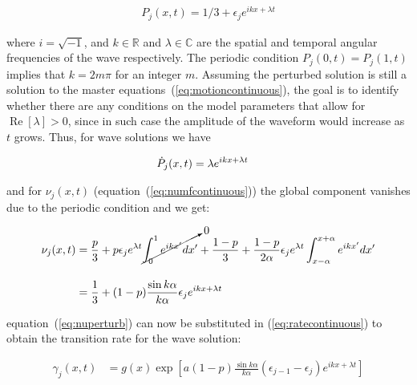 \begin{align}
    P_j(x,t) = 1/3 + \epsilon_j e^{ikx + \lambda t}
\end{align}

\noindent where $i=\sqrt{-1}$, and $k\in\mathbb{R}$ and $\lambda\in\mathbb{C}$ are the spatial and temporal angular frequencies of the
wave respectively. The periodic condition $P_j(0,t) = P_j(1,t)$ implies that $k=2m\pi$ for an integer $m$. Assuming the perturbed
solution is still a solution to the master equations~(\ref{eq:motioncontinuous}), the goal is to identify whether there are any
conditions on the model parameters that allow for $\operatorname{Re}[\lambda]>0$, since in such case the amplitude of the waveform
would increase as $t$ grows. Thus, for wave solutions we have

\begin{align}
    \dot{P}_j(x,t) &= \lambda e^{ikx + \lambda t}
    \label{eq:dpperturb}
\end{align}

\noindent and for $\nu_j(x,t)$ (equation~(\ref{eq:numfcontinuous})) the global component vanishes due to the periodic condition and we
get:

\begin{align}
    \nu_j(x,t) &= \frac{p}{3} + p\epsilon_je^{\lambda t}\cancelto{0}{\int_0^1 e^{ikx'}dx'} +
    \frac{1-p}{3} + \frac{1-p}{2\alpha} \epsilon_je^{\lambda t}\int_{x-\alpha}^{x+\alpha}e^{ikx'}dx' \notag\\[10pt]
    &= \frac{1}{3} + (1-p)\frac{\sin k\alpha}{k\alpha}\epsilon_je^{ikx+\lambda t}
    \label{eq:nuperturb}
\end{align}

\noindent equation~(\ref{eq:nuperturb}) can now be substituted in (\ref{eq:ratecontinuous}) to obtain the transition rate for the wave
solution:

\begin{align}
    \gamma_j(x,t) &= g(x)\exp\left[ a(1-p)\frac{\sin k\alpha}{k\alpha}(\epsilon_{j-1}-\epsilon_j)e^{ikx+\lambda t} \right]
\end{align}

